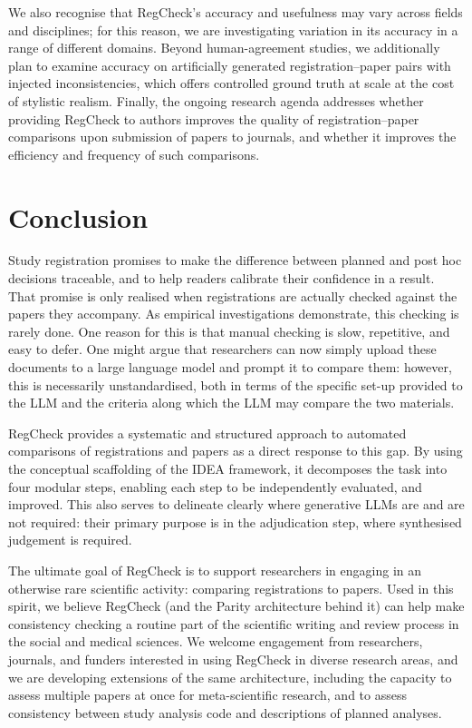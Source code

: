 \documentclass{article}
\begin{document}
We also recognise that RegCheck's accuracy and usefulness may vary across fields
and disciplines; for this reason, we are investigating variation in its accuracy
in a range of different domains. Beyond human-agreement studies, we additionally
plan to examine accuracy on artificially generated registration--paper pairs
with injected inconsistencies, which offers controlled ground truth at scale at
the cost of stylistic realism. Finally, the ongoing research agenda addresses
whether providing RegCheck to authors improves the quality of
registration--paper comparisons upon submission of papers to journals, and
whether it improves the efficiency and frequency of such comparisons.

\section{Conclusion}\label{sec:conclusion}

Study registration promises to make the difference between planned and post hoc
decisions traceable, and to help readers calibrate their confidence in a result.
That promise is only realised when registrations are actually checked against
the papers they accompany. As empirical investigations demonstrate, this
checking is rarely done. One reason for this is that manual checking is slow,
repetitive, and easy to defer. One might argue that researchers can now simply
upload these documents to a large language model and prompt it to compare them:
however, this is necessarily unstandardised, both in terms of the specific
set-up provided to the LLM and the criteria along which the LLM may compare the
two materials.

RegCheck provides a systematic and structured approach to automated comparisons
of registrations and papers as a direct response to this gap. By using the
conceptual scaffolding of the IDEA framework, it decomposes the task into four
modular steps, enabling each step to be independently evaluated, and improved.
This also serves to delineate clearly where generative LLMs are and are not
required: their primary purpose is in the adjudication step, where synthesised
judgement is required.

The ultimate goal of RegCheck is to support researchers in engaging in an
otherwise rare scientific activity: comparing registrations to papers. Used in
this spirit, we believe RegCheck (and the Parity architecture behind it) can
help make consistency checking a routine part of the scientific writing and
review process in the social and medical sciences. We welcome engagement from
researchers, journals, and funders interested in using RegCheck in diverse
research areas, and we are developing extensions of the same architecture,
including the capacity to assess multiple papers at once for meta-scientific
research, and to assess consistency between study analysis code and
descriptions of planned analyses.
\end{document}
